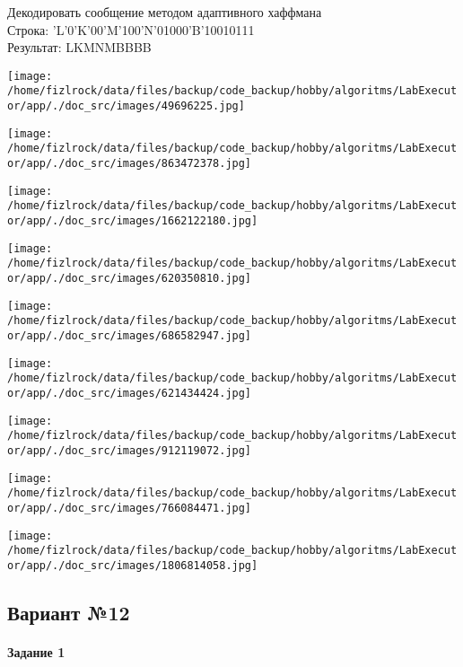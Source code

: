 \documentclass[a4paper, 12pt]{article}
\begin{document}
Декодировать сообщение методом адаптивного хаффмана \\
Строка: 
'L'0'K'00'M'100'N'01000'B'10010111\\
Результат: LKMNMBBBB

\texttt{[image: /home/fizlrock/data/files/backup/code\_backup/hobby/algoritms/LabExecutor/app/./doc\_src/images/49696225.jpg]}

\texttt{[image: /home/fizlrock/data/files/backup/code\_backup/hobby/algoritms/LabExecutor/app/./doc\_src/images/863472378.jpg]}

\texttt{[image: /home/fizlrock/data/files/backup/code\_backup/hobby/algoritms/LabExecutor/app/./doc\_src/images/1662122180.jpg]}

\texttt{[image: /home/fizlrock/data/files/backup/code\_backup/hobby/algoritms/LabExecutor/app/./doc\_src/images/620350810.jpg]}

\texttt{[image: /home/fizlrock/data/files/backup/code\_backup/hobby/algoritms/LabExecutor/app/./doc\_src/images/686582947.jpg]}

\texttt{[image: /home/fizlrock/data/files/backup/code\_backup/hobby/algoritms/LabExecutor/app/./doc\_src/images/621434424.jpg]}

\texttt{[image: /home/fizlrock/data/files/backup/code\_backup/hobby/algoritms/LabExecutor/app/./doc\_src/images/912119072.jpg]}

\texttt{[image: /home/fizlrock/data/files/backup/code\_backup/hobby/algoritms/LabExecutor/app/./doc\_src/images/766084471.jpg]}

\texttt{[image: /home/fizlrock/data/files/backup/code\_backup/hobby/algoritms/LabExecutor/app/./doc\_src/images/1806814058.jpg]}
\pagebreak
\subsection{Вариант №12}
\paragraph{Задание 1}
\end{document}
